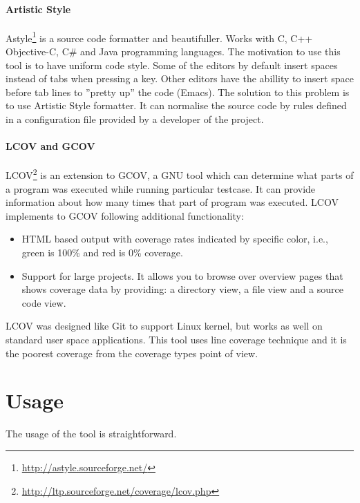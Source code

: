 \paragraph{Artistic Style}
Astyle\footnote{\url{http://astyle.sourceforge.net/}} is a source code formatter and beautifuller.
Works with C, C++ Objective-C, C\# and Java programming languages.
The motivation to use this tool is to have uniform code style.
Some of the editors by default insert spaces instead of tabs when pressing a key.
Other editors have the abillity to insert space before tab lines to ''pretty up'' the code (Emacs).
The solution to this problem is to use Artistic Style formatter.
It can normalise the source code by rules defined in a configuration file provided by a developer of the project.

\paragraph{LCOV and GCOV}
LCOV\footnote{\url{http://ltp.sourceforge.net/coverage/lcov.php}} is an extension to GCOV, a GNU tool which can determine what parts of a program was executed while running particular testcase.
It can provide information about how many times that part of program was executed.
LCOV implements to GCOV following additional functionality:
\begin{itemize}
	\item HTML based output with coverage rates indicated by specific color, i.e., green is 100\% and red is 0\% coverage.
	\item Support for large projects. It allows you to browse over overview pages that shows coverage data
	by providing: a directory view, a file view and a source code view.
\end{itemize}
LCOV was designed like Git to support Linux kernel, but works as well on standard user space applications.
This tool uses line coverage technique and it is the poorest coverage from the coverage types point of view.


\section{Usage}
The usage of the tool is straightforward.




